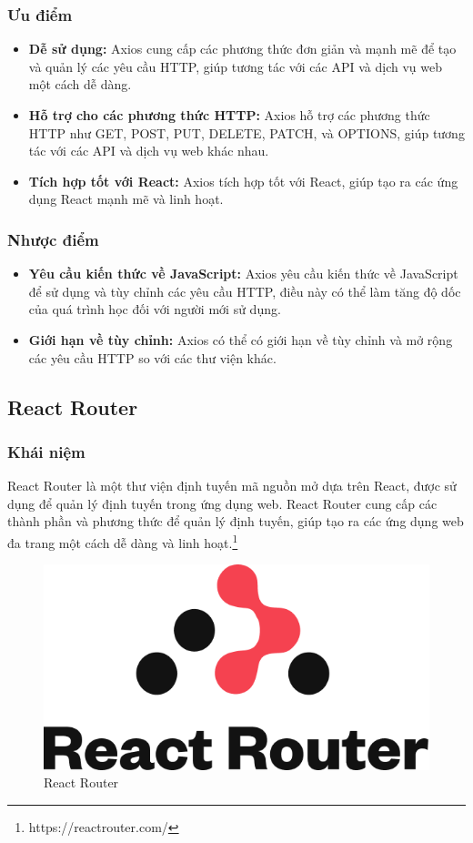 \subsubsection{Ưu điểm}
\begin{itemize}
  \item \textbf{Dễ sử dụng:} Axios cung cấp các phương thức đơn giản và mạnh mẽ để tạo và quản lý các yêu cầu HTTP, giúp tương tác với các API và dịch vụ web một cách dễ dàng.
  \item \textbf{Hỗ trợ cho các phương thức HTTP:} Axios hỗ trợ các phương thức HTTP như GET, POST, PUT, DELETE, PATCH, và OPTIONS, giúp tương tác với các API và dịch vụ web khác nhau.
  \item \textbf{Tích hợp tốt với React:} Axios tích hợp tốt với React, giúp tạo ra các ứng dụng React mạnh mẽ và linh hoạt.
\end{itemize}
\subsubsection{Nhược điểm}
\begin{itemize}
  \item \textbf{Yêu cầu kiến thức về JavaScript:} Axios yêu cầu kiến thức về JavaScript để sử dụng và tùy chỉnh các yêu cầu HTTP, điều này có thể làm tăng độ dốc của quá trình học đối với người mới sử dụng.
  \item \textbf{Giới hạn về tùy chỉnh:} Axios có thể có giới hạn về tùy chỉnh và mở rộng các yêu cầu HTTP so với các thư viện khác.
\end{itemize}
\subsection{React Router}
\subsubsection{Khái niệm}
\noindent React Router là một thư viện định tuyến mã nguồn mở dựa trên React, được sử dụng để quản lý định tuyến trong ứng dụng web. React Router cung cấp các thành phần và phương thức để quản lý định tuyến, giúp tạo ra các ứng dụng web đa trang một cách dễ dàng và linh hoạt.\footnote{https://reactrouter.com/}
\begin{figure}[H]
  \begin{center}
    \includegraphics[scale=0.3]{images/hieu/phuluc/react-router.png}
    \caption{React Router}
  \end{center}
\end{figure}
